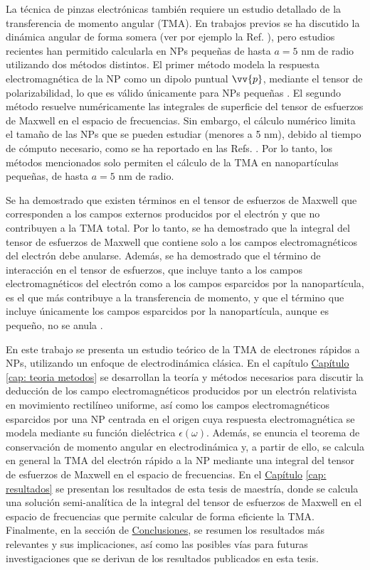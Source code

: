 La técnica de pinzas electrónicas también requiere un estudio detallado de la transferencia de momento angular (TMA). En trabajos previos se ha discutido la dinámica angular de forma somera (ver por ejemplo la Ref. \cite{GarciadeAbajo-1}), pero estudios recientes han permitido calcularla en NPs pequeñas de hasta $a=5$ nm de radio utilizando dos métodos distintos. El primer método modela la respuesta electromagnética de la NP como un dipolo puntual $\vv{p}$, mediante el tensor de polarizabilidad, lo que es válido únicamente para NPs pequeñas \cite{castellanos2021angular}. El segundo método resuelve numéricamente las integrales de superficie del tensor de esfuerzos de Maxwell\cite{castellanos2023theory, castellanos2021phdthesis} en el espacio de frecuencias. Sin embargo, el cálculo numérico limita el tamaño de las NPs que se pueden estudiar (menores a 5 nm), debido al tiempo de cómputo necesario, como se ha reportado en las Refs. \cite{castellanos2021phdthesis, castellanos2021angular,castellanos2023theory}. Por lo tanto, los métodos mencionados solo permiten el cálculo de la TMA en nanopartículas pequeñas, de hasta $a=5$ nm de radio.

Se ha demostrado que existen términos en el tensor de esfuerzos de Maxwell que corresponden a los campos externos producidos por el electrón y que no contribuyen a la TMA total. Por lo tanto, se ha demostrado que la integral del tensor de esfuerzos de Maxwell que contiene solo a los campos electromagnéticos del electrón debe anularse. Además, se ha demostrado que el término de interacción en el tensor de esfuerzos, que incluye tanto a los campos electromagnéticos del electrón como a los campos esparcidos por la nanopartícula, es el que más contribuye a la transferencia de momento, y que el término que incluye únicamente los campos esparcidos por la nanopartícula, aunque es pequeño, no se anula \cite{castellanos2021phdthesis, castrejon2021phdthesis}.

En este trabajo se presenta un estudio teórico de la TMA de electrones rápidos a NPs, utilizando un enfoque de electrodinámica clásica. En el capítulo \hyperref[cap: teoria metodos]{Capítulo} \ref{cap: teoria metodos} se desarrollan la teoría y métodos necesarios para discutir la deducción de los campo electromagnéticos producidos por un electrón relativista en movimiento rectilíneo uniforme, así como los campos electromagnéticos esparcidos por una NP centrada en el origen cuya respuesta electromagnética se modela mediante su función dieléctrica $\epsilon(\omega)$. Además, se enuncia el teorema de conservación de momento angular en electrodinámica y, a partir de ello, se calcula en general la TMA del electrón rápido a la NP mediante una integral del tensor de esfuerzos de Maxwell en el espacio de frecuencias. En el \hyperref[cap: resultados]{Capítulo} \ref{cap: resultados} se presentan los resultados de esta tesis de maestría, donde se calcula una solución semi-analítica de la integral del tensor de esfuerzos de Maxwell en el espacio de frecuencias que permite calcular de forma eficiente la TMA. Finalmente, en la sección de \hyperref[conclusiones]{Conclusiones}, se resumen los resultados más relevantes y sus implicaciones, así como las posibles vías para futuras investigaciones que se derivan de los resultados publicados en esta tesis.
